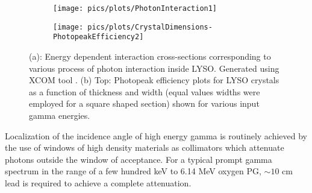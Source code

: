 \documentclass[11pt,a4paper]{article}
\begin{document}
%
%


\begin{figure}[h] 
\centering
	\begin{subfigure}[b]{0.5\textwidth} %
	\centering
	\texttt{[image: pics/plots/PhotonInteraction1]}
	\caption{}
	\end{subfigure}
	\hfill
    \hspace{0.00\textwidth} %
	\begin{subfigure}[b]{0.99\textwidth} %
	\centering
	\texttt{[image: pics/plots/CrystalDimensions-PhotopeakEfficiency2]}
	\caption{}
	\end{subfigure}
	\hfill
\caption{(a): Energy dependent interaction cross-sections corresponding to various process of photon interaction inside LYSO. Generated using XCOM tool \cite{XCOM2}. (b) Top: Photopeak efficiency plots for LYSO crystals as a function of thickness and width (equal values widths were employed for a square shaped section) shown for various input gamma energies.}
\label{fig_Intro_Crystalsize-Efficiency}
\end{figure}


Localization of the incidence angle of high energy gamma is routinely achieved by the use of windows of high density materials as collimators which attenuate photons outside the window of acceptance. For a typical prompt gamma spectrum in the range of a few hundred keV to 6.14 MeV oxygen PG, $\sim10$ cm lead is required to achieve a complete attenuation.

\end{document}
